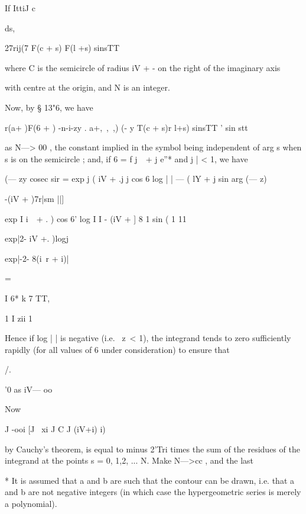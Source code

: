 If 
IttiJ c 



ds, 



27rij(7 F(c + s) F(l +s) sinsTT 

where C is the semicircle of radius iV + - on the right of the imaginary axis 

with centre at the origin, and N is an integer. 

Now, by § 13"6, we have 

r(a+ )F(6 +  ) -n-i-zy   . a+,\ ,\ ,) (- y 
T(c + s)r l+s) sinsTT   ' sin stt 

as N—> 00 , the constant implied in the symbol being independent of arg s 
when s is on the semicircle ; and, if 6  = f j\ \   +   j e''* and j   | < 1, we have 

(— zy cosec sir = exp j ( iV + .j j cos 6 log |   | — ( lY +   j sin   arg (— z) 

-(iV +  )7r|sm ||] 

exp I   i\ \   + . ) cos 6' log I   I - (iV +  ] 8 1 sin (  1 11 

exp|2- iV +. )logj  

exp|-2- 8(i\ r + i)| 



= 



  I 6* k 7 TT, 







1 I zii 1 



Hence if log |   | is negative (i.e. \ z\ <  1), the integrand tends to zero 
sufficiently rapidly (for all values of 6 under consideration) to ensure that 



/. 



'0 as iV—  oo 



Now 



J -ooi [J ~xi J C J (iV+i) i) 



by Cauchy's theorem, is equal to minus 2'Tri times the sum of the residues 
of the integrand at the points s = 0, 1,2, ... N. Make N—>cc , and the last 

* It is assumed that a and b are such that the contour can be drawn, i.e. that a and b 
are not negative integers (in which case the hypergeometric series is merely a polynomial). 



